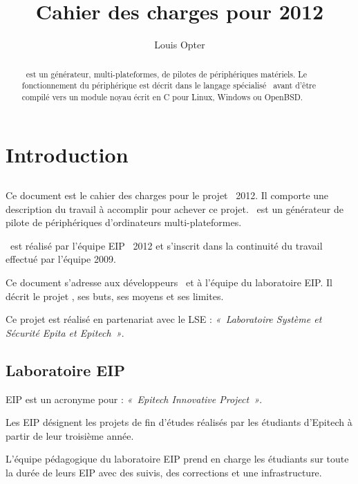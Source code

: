 \documentclass{rtxreport}
\author{Louis Opter}
\title{Cahier des charges pour 2012}
\begin{document}
\maketitle

\begin{abstract}
\rtx\ est un générateur, multi-plateformes, de pilotes de périphériques
matériels. Le fonctionnement du périphérique est décrit dans le langage
spécialisé \rtx\ avant d'être compilé vers un module noyau écrit en C pour
Linux, Windows ou OpenBSD.
\end{abstract}

\rtxmaketitleblock

\tableofcontents

\chapter{Introduction}

\section{\rtx}


Ce document est le cahier des charges pour le projet \rtx\  2012. Il comporte
une description du travail à accomplir pour achever ce projet. \rtx\  est un
générateur de pilote de périphériques d'ordinateurs multi-plateformes.

\rtx\ est réalisé par l'équipe EIP \rtx\ 2012 et s'inscrit dans la continuité
du travail effectué par l'équipe 2009.

Ce document s'adresse aux développeurs \rtx\  et à l'équipe du laboratoire EIP.
Il décrit le projet \rtx, ses buts, ses moyens et ses limites.

Ce projet est réalisé en partenariat avec le LSE : \emph{«~Laboratoire Système et
Sécurité Epita et Epitech~»}.

\section{Laboratoire EIP}


EIP est un acronyme pour : \emph{«~Epitech Innovative Project~»}.

Les EIP désignent les projets de fin d'études réalisés par les étudiants
d'Epitech à partir de leur troisième année.

L'équipe pédagogique du laboratoire EIP prend en charge les étudiants sur toute
la durée de leurs EIP avec des suivis, des corrections et une infrastructure.
\end{document}
